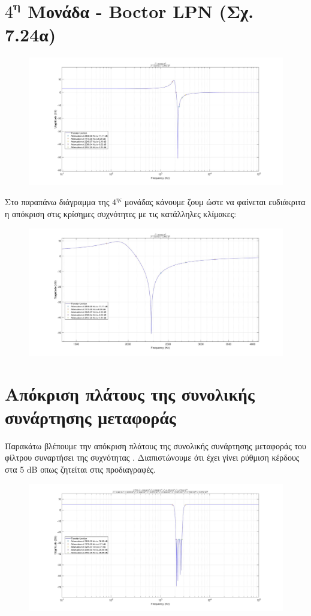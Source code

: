 \documentclass{article}
\begin{document}
{{\section*{$4^\textbf{η}$ Μονάδα - Boctor LPN (Σχ. 7.24α)} 
  \begin{figure}[h!]
\centering
 	\advance\leftskip-4cm
  \includegraphics[width=200mm,scale=2]{thema3/matlab3.jpg}
\end{figure}  
\normalsize{}
Στο παραπάνω διάγραμμα της $4^{ης}$ μονάδας κάνουμε ζουμ ώστε να φαίνεται ευδιάκριτα η απόκριση στις κρίσημες συχνότητες με τις κατάλληλες κλίμακες:
\large{}
  \begin{figure}[h!]
\centering
 	\advance\leftskip-1cm
  \includegraphics[width=120mm,scale=2]{thema3/z4.jpg}
\end{figure} 
\newpage
\section*{Aπόκριση πλάτους της συνολικής συνάρτησης μεταφοράς} 
Παρακάτω βλέπουμε την απόκριση πλάτους της συνολικής συνάρτησης μεταφοράς του φίλτρου συναρτήσει της συχνότητας . Διαπιστώνουμε ότι έχει γίνει ρύθμιση κέρδους στα 5 dB οπως ζητείται στις προδιαγραφές.
\begin{figure}[h!]
\centering
 	\advance\leftskip-4.1cm
  \includegraphics[width=200mm,scale=2]{thema3/matlab4.jpg}
\end{figure}  
\newpage
}}
\end{document}

